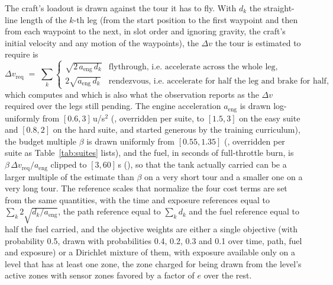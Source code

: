 The craft's loadout is drawn against the tour it has to fly. With $d_k$ the
straight-line length of the $k$-th leg (from the start position to the first
waypoint and then from each waypoint to the next, in slot order and ignoring
gravity, the craft's initial velocity and any motion of the waypoints), the
$\Delta v$ the tour is estimated to require is
\begin{equation}
\Delta v_{\mathrm{req}} \;=\; \sum_k
\begin{cases}
\sqrt{2\,a_{\mathrm{eng}}\,d_k} & \text{flythrough, i.e. accelerate across the whole leg,}\\[2pt]
2\sqrt{a_{\mathrm{eng}}\,d_k} & \text{rendezvous, i.e. accelerate for half the leg and brake for half,}
\end{cases}
\end{equation}
which  computes and which is also what the
observation reports as the $\Delta v$ required over the legs still pending.
The engine acceleration $a_{\mathrm{eng}}$ is drawn log-uniformly from
$[0.6, 3]$\,u/s$^2$ (, overridden per suite, to $[1.5, 3]$ on the
easy suite and $[0.8, 2]$ on the hard suite, and started generous by the
training curriculum), the budget multiple $\beta$ is drawn uniformly from
$[0.55, 1.35]$ (, overridden per suite as
Table~\ref{tab:suites} lists), and the fuel, in seconds of full-throttle burn,
is $\beta\,\Delta v_{\mathrm{req}} / a_{\mathrm{eng}}$ clipped to
$[3, 60]$\,s (), so that the tank actually carried can
be a larger multiple of the estimate than $\beta$ on a very short tour and a
smaller one on a very long tour. The reference scales that normalize the four
cost terms are set from the same quantities, with the time and exposure
references equal to $\sum_k 2\sqrt{d_k/a_{\mathrm{eng}}}$, the path reference
equal to $\sum_k d_k$ and the fuel reference equal to half the fuel carried, and the
objective weights are either a single objective (with probability 0.5, drawn
with probabilities 0.4, 0.2, 0.3 and 0.1 over time, path, fuel and exposure)
or a Dirichlet mixture of them, with exposure available only on a level that
has at least one zone, the zone charged for being drawn from the level's
active zones with sensor zones favored by a factor of $e$ over the rest.

